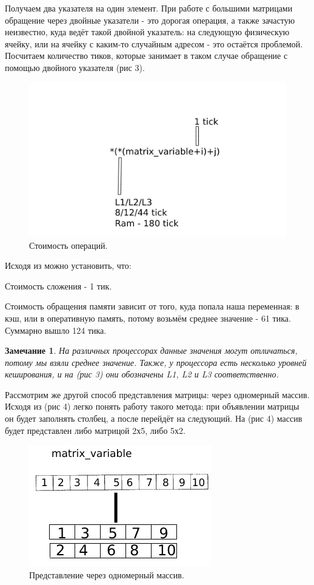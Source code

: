 \documentclass[12pt]{extarticle}
\newtheorem*{remark}{Замечание}
\begin{document}
	Получаем два указателя на один элемент. При работе с большими матрицами обращение через двойные указатели - это дорогая операция, а также зачастую неизвестно, куда ведёт такой двойной указатель: на следующую физическую ячейку, или на ячейку с каким-то случайным адресом - это остаётся проблемой. 
	Посчитаем количество тиков, которые занимает в таком случае обращение с помощью двойного указателя (рис 3).
	
	\begin{figure}[h]
			\centering
			\includegraphics[width=0.8\linewidth]{matrix_3.png}
			\caption{Стоимость операций.}
			\label{fig:mpr}
	\end{figure}
	Исходя из \cite{litlink4} можно установить, что: 
	
	Стоимость сложения - 1 тик. 
	
	Стоимость обращения памяти зависит от того, куда попала наша переменная: в кэш, или в оперативную память, потому возьмём среднее значение - 61 тика.
	Суммарно вышло 124 тика.
	\newpage
	\begin{remark}
		На различных процессорах данные значения могут отличаться, потому мы взяли среднее значение. Также, у процессора есть несколько уровней кеширования, и на (рис 3) они обозначены L1, L2 и L3 соответственно.
	\end{remark} 
	
	Рассмотрим же другой способ представления матрицы: через одномерный массив. Исходя из (рис 4) легко понять работу такого метода: при объявлении матрицы он будет заполнять столбец, а после перейдёт на следующий. На (рис 4) массив будет представлен либо матрицой 2х5, либо 5х2.
	\begin{figure}[h]
			\centering
			\includegraphics[width=0.4\linewidth]{matrix_4.png}
			\caption{Представление через одномерный массив.}
			\label{fig:mpr}
	\end{figure}
	
\end{document}
